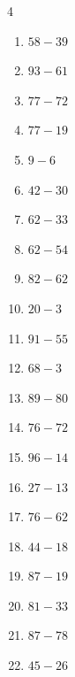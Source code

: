 \begin{multicols}{4}
\begin{enumerate}
  \item $58-39$
        \phantom{$=19$}

  \item $93-61$
        \phantom{$=32$}

  \item $77-72$
        \phantom{$=5$}

  \item $77-19$
        \phantom{$=58$}

  \item $9-6$
        \phantom{$=3$}

  \item $42-30$
        \phantom{$=12$}

  \item $62-33$
        \phantom{$=29$}

  \item $62-54$
        \phantom{$=8$}

  \item $82-62$
        \phantom{$=20$}

  \item $20-3$
        \phantom{$=17$}

  \item $91-55$
        \phantom{$=36$}

  \item $68-3$
        \phantom{$=65$}

  \item $89-80$
        \phantom{$=9$}

  \item $76-72$
        \phantom{$=4$}

  \item $96-14$
        \phantom{$=82$}

  \item $27-13$
        \phantom{$=14$}

  \item $76-62$
        \phantom{$=14$}

  \item $44-18$
        \phantom{$=26$}

  \item $87-19$
        \phantom{$=68$}

\columnbreak %

  \item $81-33$
        \phantom{$=48$}

  \item $87-78$
        \phantom{$=9$}

  \item $45-26$
        \phantom{$=19$}


\end{enumerate}
\end{multicols}
